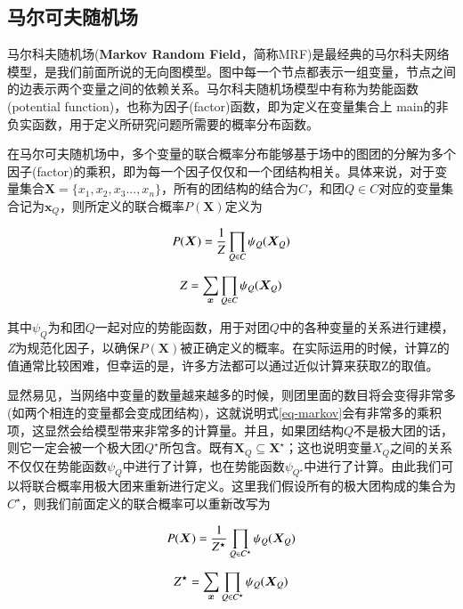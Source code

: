 \subsection{马尔可夫随机场}

马尔科夫随机场(\textbf{Markov Random Field}，简称MRF)是最经典的马尔科夫网络模型，是我们前面所说的无向图模型。图中每一个节点都表示一组变量，节点之间的边表示两个变量之间的依赖关系。马尔科夫随机场模型中有称为势能函数(potential function)，也称为因子(factor)函数，即为定义在变量集合上 main的非负实函数，用于定义所研究问题所需要的概率分布函数。

在马尔可夫随机场中，多个变量的联合概率分布能够基于场中的图团的分解为多个因子(factor)的乘积，即为每一个因子仅仅和一个团结构相关。具体来说，对于变量集合$\bm{X} = \{x_1, x_2, x_3..., x_n\}$，所有的团结构的结合为$C$，和团$Q \in C$对应的变量集合记为$\bm{x}_Q$，则所定义的联合概率$P(\bm{X})$定义为

\begin{equation}
	P(\bm{X}) = \frac{1}{Z} \prod_{Q \in C} \psi_Q(\bm{X}_Q) \\
	\label{eq-markov}
\end{equation}

\begin{equation}
Z = \sum_{\bm{x}} \prod_{Q \in C} \psi_Q(\bm{X}_Q) \\
\end{equation}


其中$\psi_Q$为和团$Q$一起对应的势能函数，用于对团$Q$中的各种变量的关系进行建模，\textit{Z}为规范化因子，以确保$P(\bm{X})$被正确定义的概率。在实际运用的时候，计算Z的值通常比较困难，但幸运的是，许多方法都可以通过近似计算来获取Z的取值。

显然易见，当网络中变量的数量越来越多的时候，则团里面的数目将会变得非常多(如两个相连的变量都会变成团结构)，这就说明式\ref{eq-markov}会有非常多的乘积项，这显然会给模型带来非常多的计算量。并且，如果团结构$Q$不是极大团的话，则它一定会被一个极大团$Q^{\star}$所包含。既有$\bm{X}_Q \subseteq \bm{X}^{\star}$；这也说明变量$X_Q$之间的关系不仅仅在势能函数$\psi_Q$中进行了计算，也在势能函数$\psi_{Q^{\star}}$中进行了计算。由此我们可以将联合概率用极大团来重新进行定义。这里我们假设所有的极大团构成的集合为$C^{\star}$，则我们前面定义的联合概率可以重新改写为

\begin{equation}
	P(\bm{X}) = \frac{1}{Z^{\star}} \prod_{Q \in C^{\star}} \psi_Q(\bm{X}_Q) \\
\end{equation}


\begin{equation}
Z^{\star} = \sum_{\bm{x}} \prod_{Q \in C^{\star}} \psi_Q(\bm{X}_Q) \\
\end{equation}


